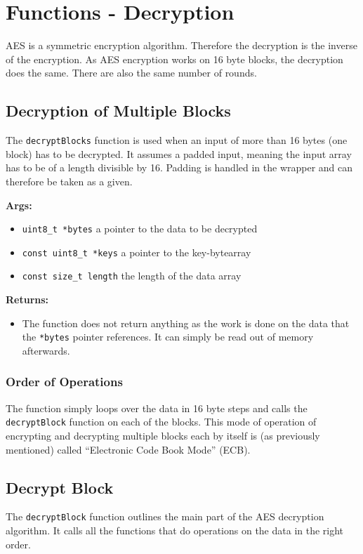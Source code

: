 \section{Functions - Decryption}
\label{ch:decryption}

AES is a symmetric encryption algorithm. Therefore the decryption is the inverse of the encryption. As AES encryption works on 16 byte blocks, the decryption does the same. There are also the same number of rounds.

\subsection{Decryption of Multiple Blocks}
\label{ch:dec_multipleblocks}
The \lstinline|decryptBlocks| function is used when an input of more than 16 bytes (one block) has to be decrypted. It assumes a padded input, meaning the input array has to be of a length divisible by 16. Padding is handled in the wrapper and can therefore be taken as a given.

\textbf{Args:}
\begin{itemize}
  \item \lstinline{uint8_t *bytes} a pointer to the data to be decrypted
  \item \lstinline{const uint8_t *keys} a pointer to the key-bytearray
  \item \lstinline{const size_t length} the length of the data array
\end{itemize}

\textbf{Returns:}
\begin{itemize}
  \item The function does not return anything as the work is done on the data that the \lstinline{*bytes} pointer references. It can simply be read out of memory afterwards.
\end{itemize}

\subsubsection{Order of Operations}
The function simply loops over the data in 16 byte steps and calls the \lstinline{decryptBlock} function on each of the blocks. This mode of operation of encrypting and decrypting multiple blocks each by itself is (as previously mentioned) called \enquote{Electronic Code Book Mode} (ECB).

\subsection{Decrypt Block}
\label{ch:dec_block}
The \lstinline{decryptBlock} function outlines the main part of the AES decryption algorithm. It calls all the functions that do operations on the data in the right order.

